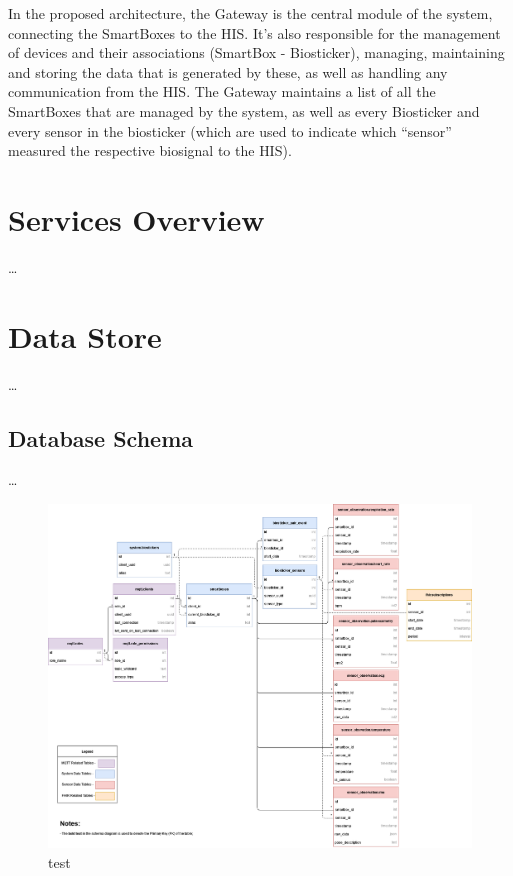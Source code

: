 

In the proposed architecture, the Gateway is the central module of the system, connecting the SmartBoxes to the \acs{HIS}. It's also responsible for the management of devices and their associations (SmartBox - Biosticker), managing, maintaining and storing the data that is generated by these, as well as handling any communication from the \acs{HIS}. The Gateway maintains a list of all the SmartBoxes that are managed by the system, as well as every Biosticker and every sensor in the biosticker (which are used to indicate which ``sensor'' measured the respective biosignal to the \acs{HIS}). 


\section{Services Overview}
\dots 
\section{Data Store}
\dots 


\subsection{Database Schema}
\dots 

\begin{figure}[H]
    \centering
    \includegraphics[width=\linewidth]{images/wow-dbschema-full.png}
    \caption[test]{test}
    \label{fig:wow-dbschema-full}
\end{figure}

